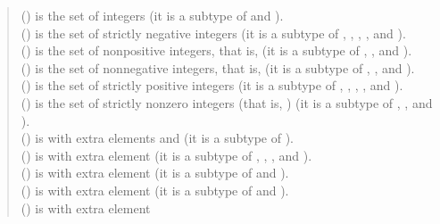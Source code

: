 \begin{description}
\begin{quote}
\begin{tabbing}
 () is the set of integers
(it is a subtype of  and ).
\\
 () is the set of strictly negative integers
(it is a subtype of , , , , and ).
\\
 () is the set of nonpositive integers, that is, 
(it is a subtype of , , and ).
\\
 () is the set of nonnegative integers, that is, 
(it is a subtype of , , and ).
\\
 () is the set of strictly positive integers
(it is a subtype of , , , , and ).
\\
 () is the set of strictly nonzero integers (that is, )
(it is a subtype of , , and ).
\\
 () is  with extra elements \EXP{+\infty} and \EXP{-\infty}
(it is a subtype of ).
\\
 () is  with extra element \EXP{-\infty}
(it is a subtype of , , , and ).
\\
 () is  with extra element \EXP{-\infty}
(it is a subtype of  and ).
\\
 () is  with extra element \EXP{+\infty}
(it is a subtype of  and ).
\\
 () is  with extra element \EXP{+\infty}

\end{tabbing}
\end{quote}
\end{description}
